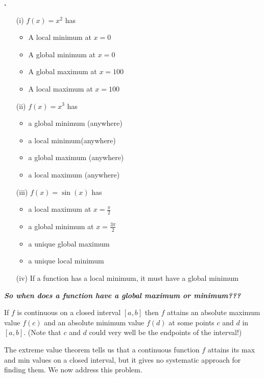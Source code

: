 \documentclass[t]{beamer}
\theoremstyle{plain}
\theoremstyle{definition}
\newcounter{heading}
\newcommand{\newhead}[1]{\medskip\stepcounter{heading}\noindent\textbf{\hspace{0.2cm}{#1}.}}
\begin{document}
\begin{frame}
\newhead{True or False?}
\begin{enumerate}[<+->]
\item[(i)]$f(x) = x^{2}$ has \begin{itemize}\item  A local minimum at $x = 0$  \item A global minimum at $x = 0$ \item  A global maximum at $x = 100$ \item A local maximum at $x = 100$ \end{itemize}
\item[(ii)] $f(x) = x^{3}$ has \begin{itemize}\item a global minimum (anywhere) \item a local minimum(anywhere) \item a global maximum (anywhere) \item a local maximum (anywhere) \end{itemize}
\item[(iii)] $f(x) = \sin(x)$ has \begin{itemize} \item a local maximum at $x = \frac{\pi}{2}$ \item a global minimum at $x = \frac{3\pi}{2}$ \item a unique global maximum \item a unique local minimum \end{itemize}
\item[(iv)] If a function has a local minimum, it must have a global minimum
\end{enumerate}
\end{frame}

\begin{frame}
\noindent \textbf{\emph{So when does a function have a global maximum or minimum???}}\pause
\[ \]
\begin{theorem} If $f$ is continuous on a closed interval $[a,b]$ then $f$ attains an absolute maximum value $f(c)$ and an absolute minimum value $f(d)$ at some points $c$ and $d$ in $[a,b]$.  (Note that $c$ and $d$ could very well be the endpoints of the interval!)
\end{theorem} \pause
\vfill

\noindent The extreme value theorem tells us that a continuous function $f$ attains its max and min values on a closed interval, but it gives no systematic approach for finding them. We now address this problem.
\end{frame}
\end{document}
